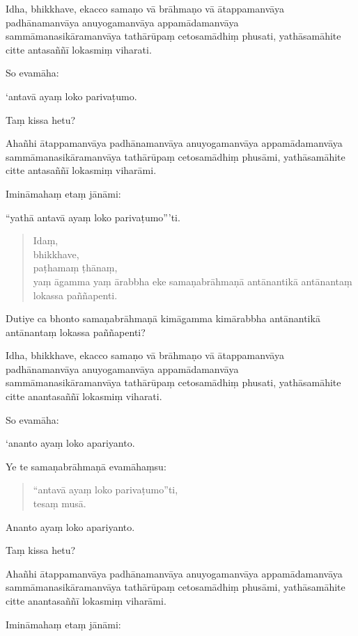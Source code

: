 \documentclass[11pt,twoside,openright]{book}
\begin{document}
\pstart
Idha, bhikkhave, ekacco samaṇo vā brāhmaṇo vā ātappamanvāya padhānamanvāya anuyogamanvāya appamādamanvāya sammāmanasikāramanvāya tathārūpaṃ cetosamādhiṃ phusati, yathāsamāhite citte antasaññī lokasmiṃ viharati.
\pend

\pstart
So evamāha:
\pend

\pstart
‘antavā ayaṃ loko parivaṭumo.
\pend

\pstart
Taṃ kissa hetu?
\pend

\pstart
Ahañhi ātappamanvāya padhānamanvāya anuyogamanvāya appamādamanvāya sammāmanasikāramanvāya tathārūpaṃ cetosamādhiṃ phusāmi, yathāsamāhite citte antasaññī lokasmiṃ viharāmi.
\pend

\pstart
Imināmahaṃ etaṃ jānāmi:
\pend

\pstart
“yathā antavā ayaṃ loko parivaṭumo”’ti.
\pend

\begin{verse}
Idaṃ,\\
\vin  bhikkhave,\\
\vin  paṭhamaṃ ṭhānaṃ,\\
\vin  yaṃ āgamma yaṃ ārabbha eke samaṇabrāhmaṇā antānantikā antānantaṃ lokassa paññapenti.

\end{verse}
\pstart
Dutiye ca bhonto samaṇabrāhmaṇā kimāgamma kimārabbha antānantikā antānantaṃ lokassa paññapenti?
\pend

\pstart
Idha, bhikkhave, ekacco samaṇo vā brāhmaṇo vā ātappamanvāya padhānamanvāya anuyogamanvāya appamādamanvāya sammāmanasikāramanvāya tathārūpaṃ cetosamādhiṃ phusati, yathāsamāhite citte anantasaññī lokasmiṃ viharati.
\pend

\pstart
So evamāha:
\pend

\pstart
‘ananto ayaṃ loko apariyanto.
\pend

\pstart
Ye te samaṇabrāhmaṇā evamāhaṃsu:
\pend

\begin{verse}
“antavā ayaṃ loko parivaṭumo”ti,\\
\vin  tesaṃ musā.

\end{verse}
\pstart
Ananto ayaṃ loko apariyanto.
\pend

\pstart
Taṃ kissa hetu?
\pend

\pstart
Ahañhi ātappamanvāya padhānamanvāya anuyogamanvāya appamādamanvāya sammāmanasikāramanvāya tathārūpaṃ cetosamādhiṃ phusāmi, yathāsamāhite citte anantasaññī lokasmiṃ viharāmi.
\pend

\pstart
Imināmahaṃ etaṃ jānāmi:
\pend
\end{document}

